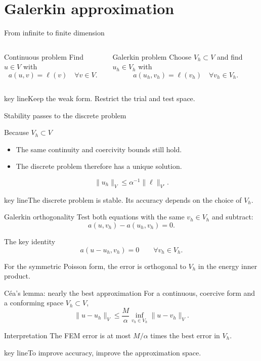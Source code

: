 \documentclass[aspectratio=169,11pt]{beamer}
\newcommand{\key}[1]{\par\vspace{4mm}\begin{beamercolorbox}[sep=2.5mm,wd=\textwidth]{key line}\normalsize #1\end{beamercolorbox}}
\begin{document}
\section{Galerkin approximation}
\begin{frame}{From infinite to finite dimension}
\begin{columns}[c,onlytextwidth]
\begin{block}{Continuous problem}
Find $u\in V$ with\[
a(u,v)=\ell(v)\quad\forall v\in V.
\]
\end{block}
\begin{exampleblock}{Galerkin problem}
Choose $V_h\subset V$ and find $u_h\in V_h$ with\[
a(u_h,v_h)=\ell(v_h)\quad\forall v_h\in V_h.
\]
\end{exampleblock}
\end{columns}\key{Keep the weak form. Restrict the trial and test space.}
\end{frame}

\begin{frame}{Stability passes to the discrete problem}
\begin{block}{Because $V_h\subset V$}
\begin{itemize}
\item The same continuity and coercivity bounds still hold.
\item The discrete problem therefore has a unique solution.
\end{itemize}
\end{block}\[
\|u_h\|_V\le\alpha^{-1}\|\ell\|_{V\prime}.
\]\key{The discrete problem is stable. Its accuracy depends on the choice of $V_h$.}
\end{frame}

\begin{frame}{Galerkin orthogonality}
Test both equations with the same $v_h\in V_h$ and subtract:\[
a(u,v_h)-a(u_h,v_h)=0.
\]\begin{exampleblock}{The key identity}
\[
\boxed{a(u-u_h,v_h)=0\qquad\forall v_h\in V_h.}
\]
\end{exampleblock}For the symmetric Poisson form, the error is orthogonal to $V_h$ in the energy inner product.
\end{frame}

\begin{frame}{C\'ea's lemma: nearly the best approximation}
For a continuous, coercive form and a conforming space $V_h\subset V$,\[
\boxed{\|u-u_h\|_V\le\frac{M}{\alpha}\inf_{v_h\in V_h}\|u-v_h\|_V.}
\]\begin{exampleblock}{Interpretation}
The FEM error is at most $M/\alpha$ times the best error in $V_h$.
\end{exampleblock}\key{To improve accuracy, improve the approximation space.}
\end{frame}
\end{document}
